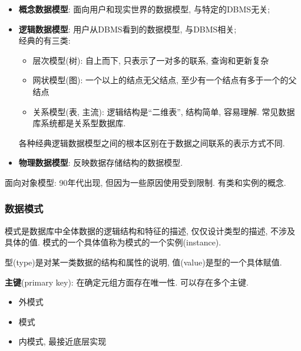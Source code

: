             \begin{itemize}
                \item \textbf{概念数据模型}: 面向用户和现实世界的数据模型, 与特定的DBMS无关;
                \item \textbf{逻辑数据模型}: 用户从DBMS看到的数据模型, 与DBMS相关; \\
                    经典的有三类: 
                    \begin{itemize}
                        \item 层次模型(树): 自上而下, 只表示了一对多的联系, 查询和更新复杂
                        \item 网状模型(图): 一个以上的结点无父结点, 至少有一个结点有多于一个的父结点
                        \item 关系模型(表, 主流): 逻辑结构是``二维表'', 结构简单, 容易理解. 常见数据库系统都是关系型数据库.
                    \end{itemize}
                    各种经典逻辑数据模型之间的根本区别在于数据之间联系的表示方式不同.
                \item \textbf{物理数据模型}: 反映数据存储结构的数据模型.
            \end{itemize}

            面向对象模型: 90年代出现, 但因为一些原因使用受到限制. 有类和实例的概念. 

        \subsubsection{数据模式}

            模式是数据库中全体数据的逻辑结构和特征的描述, 仅仅设计类型的描述, 不涉及具体的值. 模式的一个具体值称为模式的一个实例(instance).

            型(type)是对某一类数据的结构和属性的说明, 值(value)是型的一个具体赋值.

            \textbf{主键}(primary key): 在确定元组方面存在唯一性. 可以存在多个主键.

            \begin{itemize}
                \item 外模式
                \item 模式
                \item 内模式, 最接近底层实现
            \end{itemize}

